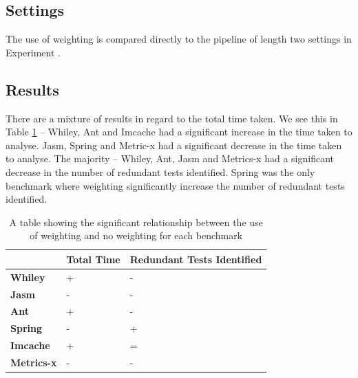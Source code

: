 \subsection{Settings}
The use of weighting is compared directly to the pipeline of length two settings in Experiment .


\subsection{Results}
There are a mixture of results in regard to the total time taken. We see this in Table \ref{weightingsig} -- Whiley, Ant and Imcache had a significant increase in the time taken to analyse. Jasm, Spring and Metric-x had a significant decrease in the time taken to analyse. The majority -- Whiley, Ant, Jasm and Metrics-x had a significant decrease in the number of redundant tests identified. Spring was the only benchmark where weighting significantly increase the number of redundant tests identified.

\begin{table}[h]
\centering


\begin{tabular}{|l|l|l|}
\hline
{\bf }          & {\bf Total Time} & {\bf Redundant Tests Identified} \\ \hline
{\bf Whiley}    & +                & -                           \\ \hline
{\bf Jasm}      & -                & -                           \\ \hline
{\bf Ant}       & +                & -                           \\ \hline
{\bf Spring}    & -                & +                           \\ \hline
{\bf Imcache}   & +                & =                           \\ \hline
{\bf Metrics-x} & -                & -                           \\ \hline
\end{tabular}
\caption{A table showing the significant relationship between the use of weighting and no weighting for each benchmark}
\label{weightingsig}
\end{table}


